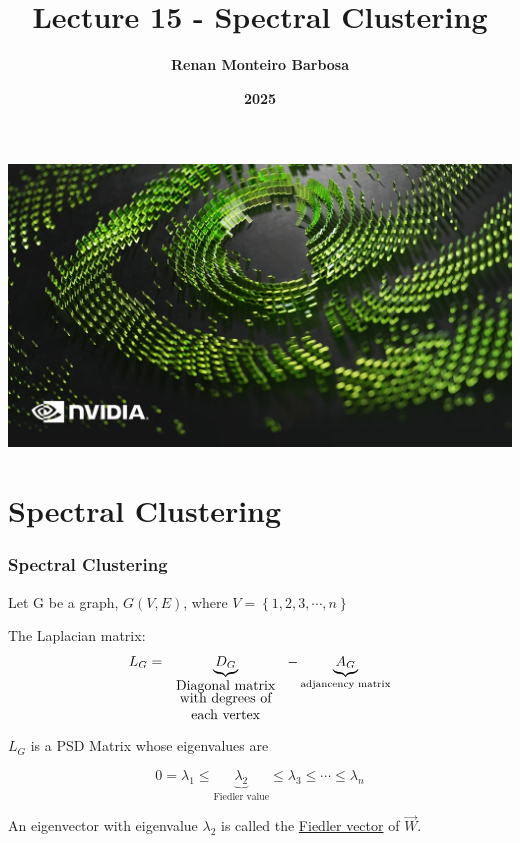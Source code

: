\documentclass{beamer}
\begin{document}
{
{
    \includegraphics[width=\paperwidth,height=\paperheight]{images/Screenshot_9-12-2024_212019_.jpeg}
}
\title{\textbf{Lecture 15 - Spectral Clustering}}
\author[]{\textbf{Renan Monteiro Barbosa}}
\date[]{\textbf{2025}}
\maketitle
}


\section{Spectral Clustering}
\begin{frame}
\frametitle{\textbf{Spectral Clustering} }

Let G be a graph, $G(V,E)$, where $V = \left\{1,2,3, \cdots, n\right\}$ \vspace{0.2 cm}

The Laplacian matrix: 
\[
L_{G} = \underbrace{D_{G}}_{\parbox{3cm}{\centering Diagonal matrix \\[-3pt] with degrees of each vertex}} - \underbrace{A_{G}}_{\text{adjancency matrix}}
\]

$L_{G}$ is a PSD Matrix whose eigenvalues are

\begin{equation*}
    0 = \lambda_1 \leq \underbrace{\lambda_2}_{\text{Fiedler value}}\leq \lambda_3 \leq \cdots \leq \lambda_n
\end{equation*}

An eigenvector with eigenvalue $\lambda_2$ is called the \underline{Fiedler vector} of $\vec{W}$.


\end{frame}
\end{document}
